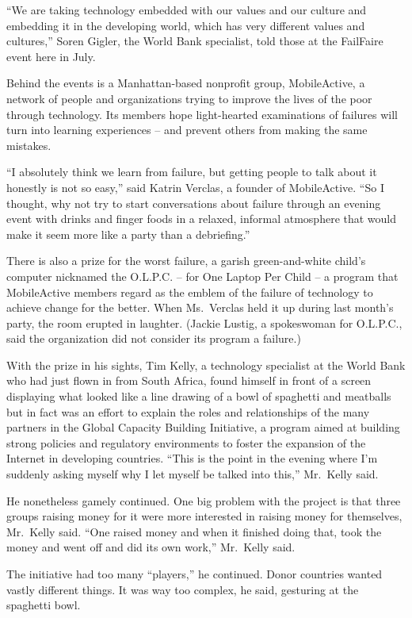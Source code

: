 ﻿\documentclass[12pt]{article}
\begin{document}
``We are taking technology embedded with our values and our culture and embedding it in the
developing world, which has very different values and cultures,'' Soren Gigler, the World Bank
specialist, told those at the FailFaire event here in July.

Behind the events is a Manhattan-based nonprofit group, MobileActive, a network of people and
organizations trying to improve the lives of the poor through technology. Its members hope
light-hearted examinations of failures will turn into learning experiences -- and prevent others
from making the same mistakes.

``I absolutely think we learn from failure, but getting people to talk about it honestly is not so
easy,'' said Katrin Verclas, a founder of MobileActive. ``So I thought, why not try to start
conversations about failure through an evening event with drinks and finger foods in a relaxed,
informal atmosphere that would make it seem more like a party than a debriefing.''

There is also a prize for the worst failure, a garish green-and-white child's computer nicknamed the
O.L.P.C. -- for One Laptop Per Child -- a program that MobileActive members regard as the emblem of
the failure of technology to achieve change for the better. When Ms.~Verclas held it up during last
month's party, the room erupted in laughter. (Jackie Lustig, a spokeswoman for O.L.P.C., said the
organization did not consider its program a failure.)

With the prize in his sights, Tim Kelly, a technology specialist at the World Bank who had just
flown in from South Africa, found himself in front of a screen displaying what looked like a line
drawing of a bowl of spaghetti and meatballs but in fact was an effort to explain the roles and
relationships of the many partners in the Global Capacity Building Initiative, a program aimed at
building strong policies and regulatory environments to foster the expansion of the Internet in
developing countries. ``This is the point in the evening where I'm suddenly asking myself why I let
myself be talked into this,'' Mr.~Kelly said.

He nonetheless gamely continued. One big problem with the project is that three groups raising money
for it were more interested in raising money for themselves, Mr.~Kelly said. ``One raised money and
when it finished doing that, took the money and went off and did its own work,'' Mr.~Kelly said.

The initiative had too many ``players,'' he continued. Donor countries wanted vastly different
things. It was way too complex, he said, gesturing at the spaghetti bowl.
\end{document}
